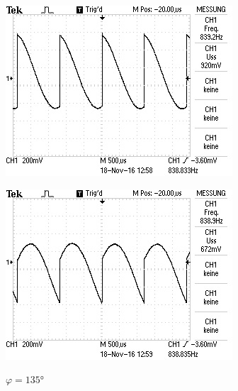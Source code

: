 \begin{figure}[!h]
\begin{minipage}[t]{0.3\textwidth}
\includegraphics[width=\textwidth]{Bilder/Rausch165.jpg}
\label{fig:9}
\caption*{$\varphi = 90\si{\degree}$}
\end{minipage}
\hspace{10pt}
\vspace{5pt}
\begin{minipage}[t]{0.3\textwidth}
\includegraphics[width=\textwidth]{Bilder/Rausch240.jpg}
\label{fig:10}
\caption*{$\varphi = 135\si{\degree}$}
\end{minipage}
\hspace{12pt}
\vspace{5pt}
\begin{minipage}[t]{0.3\textwidth}

\end{minipage}
\end{figure}
